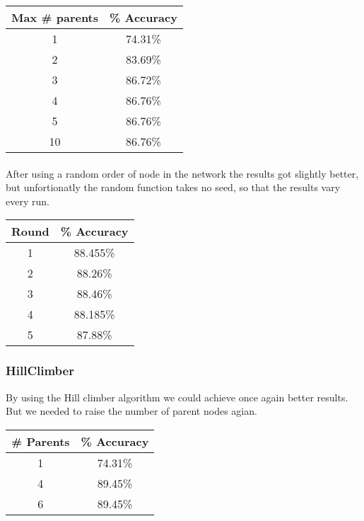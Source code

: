 \documentclass{sig-alternate-05-2015}
\begin{document}
{\begin{center}
\begin{tabular}{ c | c }
\textbf{Max \# parents} & \textbf{\% Accuracy} \\
\hline
1  & 74.31\% \\
2  & 83.69\% \\
3  & 86.72\% \\
4  & 86.76\% \\
5  & 86.76\% \\
10 & 86.76\% \\
\end{tabular}
\end{center}

\paragraph{}After using a random order of node in the network the results got slightly better, but unfortionatly the random function takes no seed, so that the results vary every run.

\begin{center}
\begin{tabular}{ c | c }
\textbf{Round} & \textbf{\% Accuracy} \\
\hline
1  & 88.455\% \\
2  & 88.26\% \\
3  & 88.46\% \\
4  & 88.185\% \\
5  & 87.88\% \\
\end{tabular}
\end{center}

\subsubsection{HillClimber}
By using the Hill climber algorithm we could achieve once again better results. But we needed to raise the number of parent nodes agian.
\begin{center}
\begin{tabular}{ c | c }
\textbf{\# Parents} & \textbf{\% Accuracy} \\
\hline
1  & 74.31\% \\
4  & 89.45\% \\
6  & 89.45\% \\
\end{tabular}
\end{center}

}
\end{document}
